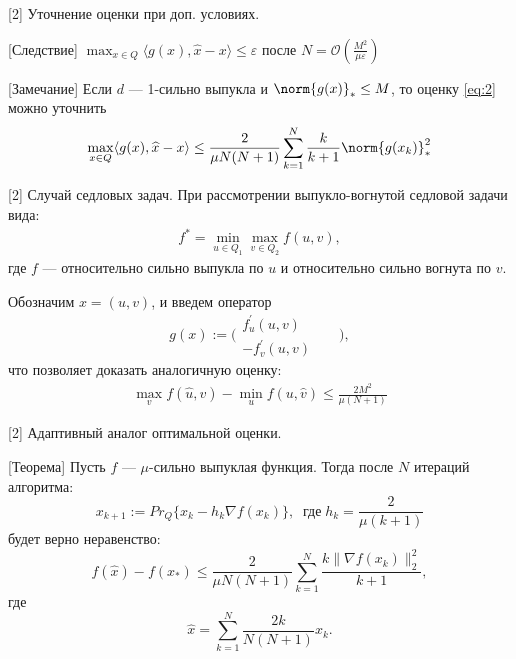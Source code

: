 \begin{frame}{[2] Уточнение оценки при доп. условиях.}
    \begin{block}{[Следствие]}
         $ \max_{x \in Q} \langle g(x), \widehat{x} - x\rangle \leq \varepsilon$
        после $N = \mathcal{O}(\frac{M^2}{\mu \varepsilon})$
    \end{block}
    \begin{block}{[Замечание]}
        Если $d$ --- 1-сильно выпукла и $\norm{g(x)}_* \leq M$, то оценку \eqref{eq:2} можно уточнить
        \begin{equation}
            \max_{x \in Q} \langle g(x), \widehat{x} - x\rangle \leq \frac{2}{\mu N (N+1)} \sum_{k=1}^{N} \frac{k}{k+1} \norm{g(x_k)}_*^2
        \end{equation}
    \end{block}
\end{frame}

\begin{frame}{[2] Случай седловых задач.}
    При рассмотрении выпукло-вогнутой седловой задачи вида:
    \begin{equation}
    \begin{aligned} 
        f^* = \min_{u \in Q_1} \max_{v \in Q_2} f(u, v),
    \end{aligned}
    \end{equation}
    где $f$ --- относительно сильно выпукла по $u$ и относительно сильно вогнута по $v$.

    Обозначим $x = (u, v)$, и введем оператор 
    $$ 
      g(x) := \Bigg( 
      \begin{aligned}
        f^{'}_{u}(u,v)&&\\
        -f^{'}_{v}(u,v)&&
      \end{aligned}
      \Bigg), 
    $$
    что позволяет доказать аналогичную оценку:
    \begin{equation}
    \begin{aligned}
        \max_{v} f(\widehat{u}, v) - \min_{u} f(u, \widehat{v}) \leq \frac{2M^2}{\mu (N+1)}
    \end{aligned}
    \end{equation}
\end{frame}


\begin{frame}{[2] Адаптивный аналог оптимальной оценки.}
    \begin{block}{[Теорема]}
    Пусть $f$ --- $\mu$-сильно выпуклая функция. Тогда после $N$ итераций алгоритма:
    \begin{equation}\label{orig_2}
        x_{k+1} := Pr_{Q}\{x_k - h_k \nabla f(x_k) \}, \;\; \textit{где} \; h_k = \frac{2}{\mu (k+1)}
    \end{equation}
    будет верно неравенство:
    \begin{equation}\label{adaptive_estimation_f}
        f(\widehat{x}) - f(x_*) \leq \frac{2}{\mu N (N+1)} \sum_{k=1}^{N} \frac{k \|\nabla f(x_k)\|_2^2}{k+1},
    \end{equation}
    где
    $$
        \widehat{x} = \sum_{k=1}^{N} \frac{2 k}{N (N+1)} x_k.
    $$
    \end{block}
\end{frame}


